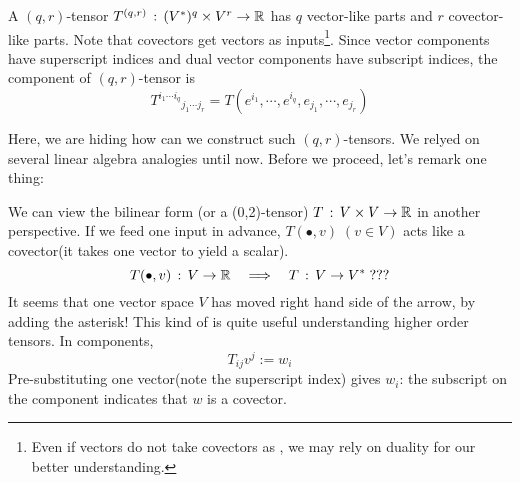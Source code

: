 \documentclass[a4paper, 10pt]{article}
\begin{document}
\seprule

\begin{definition}[($q,r$)-tensors]
    A $(q,r)$-tensor $T^{(q,r)} \,:\, (V^{\ast})^{q} \times V^{r} \rightarrow \mathbb{R}$ has $q$ vector-like parts and $r$ covector-like parts. Note that covectors get vectors as inputs\footnote{Even if vectors do not take covectors as , we may rely on duality for our better understanding.}. Since vector components have superscript indices and dual vector components have subscript indices, the component of $(q,r)$-tensor is
    \[ T^{i_{1}\cdots i_{q}}{}_{j_{1}\cdots j_{r}} = T(e^{i_{1}}, \cdots, e^{i_{q}}, e_{j_{1}}, \cdots, e_{j_{r}}) \]
\end{definition}

Here, we are hiding how can we construct such $(q,r)$-tensors. We relyed on several linear algebra analogies until now. Before we proceed, let's remark one thing:

\begin{remark}
    We can view the bilinear form (or a (0,2)-tensor) $T\,:\, V\times V \rightarrow \mathbb{R}$ in another perspective. If we feed one input in advance, $T(\bullet, v) \;(v\in V)$ acts like a covector(it takes one vector to yield a scalar).
    \[ T(\bullet, v) \,:\, V \rightarrow \mathbb{R} \quad\Longrightarrow\quad T\,:\, V \rightarrow V^{\ast} \;??? \]
    It seems that one vector space $V$ has moved right hand side of the arrow, by adding the asterisk! This kind of  is quite useful understanding higher order tensors. In components,
    \[ T_{ij}v^{j} := w_{i} \]
    Pre-substituting one vector(note the superscript index) gives $w_{i}$: the subscript on the component indicates that $w$ is a covector.
\end{remark}
\newpage

\end{document}
